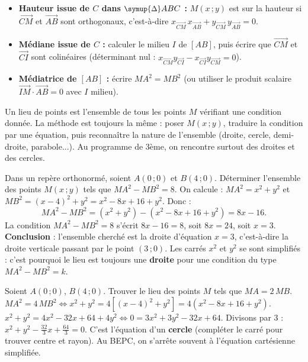 \documentclass[11pt]{article}
\newcommand{\cle}[1]{{\popxbold\color{popdark}#1}}
\newcounter{popsec}
\newcounter{popsub}
\newcommand{\courssub}[1]{%
  \stepcounter{popsub}%
  \par\vspace{9pt}\noindent{\popxbold\fontsize{11.5}{13}\selectfont\color{popink}{\color{poporange}\thepopsec.\thepopsub}\hspace{6pt}#1}\par\nopagebreak\vspace{4pt}
}
\def\triangle{\mathord{\scalebox{0.9}{$\symup{\Delta}$}}}%
\begin{document}
\begin{methode}
\begin{itemize}
\item \textbf{Hauteur issue de $C$ dans $\triangle ABC$ :} $M(x\,;y)$ est sur la hauteur si $\overrightarrow{CM}$ et $\overrightarrow{AB}$ sont orthogonaux, c'est-à-dire $x_{\overrightarrow{CM}}\,x_{\overrightarrow{AB}} + y_{\overrightarrow{CM}}\,y_{\overrightarrow{AB}} = 0$.
\item \textbf{Médiane issue de $C$ :} calculer le milieu $I$ de $[AB]$, puis écrire que $\overrightarrow{CM}$ et $\overrightarrow{CI}$ sont colinéaires (déterminant nul : $x_{\overrightarrow{CM}}y_{\overrightarrow{CI}} - x_{\overrightarrow{CI}}y_{\overrightarrow{CM}} = 0$).
\item \textbf{Médiatrice de $[AB]$ :} écrire $MA^2 = MB^2$ (ou utiliser le produit scalaire $\overrightarrow{IM}\cdot\overrightarrow{AB}=0$ avec $I$ milieu).
\end{itemize}
\end{methode}

\courssub{Problème type 3 : lieu de points}

Un \cle{lieu de points} est l'ensemble de tous les points $M$ vérifiant une condition donnée. La méthode est toujours la même : poser $M(x\,;y)$, traduire la condition par une équation, puis reconnaître la nature de l'ensemble (droite, cercle, demi-droite, parabole...). Au programme de 3ème, on rencontre surtout des droites et des cercles.

\begin{exoresolu}[Lieu de points : $MA^2 - MB^2 = k$]
Dans un repère orthonormé, soient $A(0\,;0)$ et $B(4\,;0)$. Déterminer l'ensemble des points $M(x\,;y)$ tels que $MA^2 - MB^2 = 8$.
\tcblower
On calcule : $MA^2 = x^2 + y^2$ et $MB^2 = (x-4)^2 + y^2 = x^2 - 8x + 16 + y^2$. Donc :
\[ MA^2 - MB^2 = (x^2+y^2) - (x^2 - 8x + 16 + y^2) = 8x - 16. \]
La condition $MA^2 - MB^2 = 8$ s'écrit $8x - 16 = 8$, soit $8x = 24$, soit $x = 3$.
\textbf{Conclusion} : l'ensemble cherché est la droite d'équation $x = 3$, c'est-à-dire la droite verticale passant par le point $(3\,;0)$. Les carrés $x^2$ et $y^2$ se sont simplifiés : c'est pourquoi le lieu est toujours une \textbf{droite} pour une condition du type $MA^2 - MB^2 = k$.
\end{exoresolu}

\begin{exemplebox}[Lieu de points : $MA = k \cdot MB$ (Cercle d'Apollonius)]
Soient $A(0\,;0)$, $B(4\,;0)$. Trouver le lieu des points $M$ tels que $MA = 2\,MB$.
$MA^2 = 4\,MB^2 \iff x^2+y^2 = 4[(x-4)^2+y^2] = 4(x^2-8x+16+y^2)$.
$x^2+y^2 = 4x^2 - 32x + 64 + 4y^2 \iff 0 = 3x^2 + 3y^2 - 32x + 64$.
Divisons par 3 : $x^2+y^2 - \frac{32}{3}x + \frac{64}{3} = 0$.
C'est l'équation d'un \textbf{cercle} (compléter le carré pour trouver centre et rayon). Au BEPC, on s'arrête souvent à l'équation cartésienne simplifiée.
\end{exemplebox}
\end{document}
